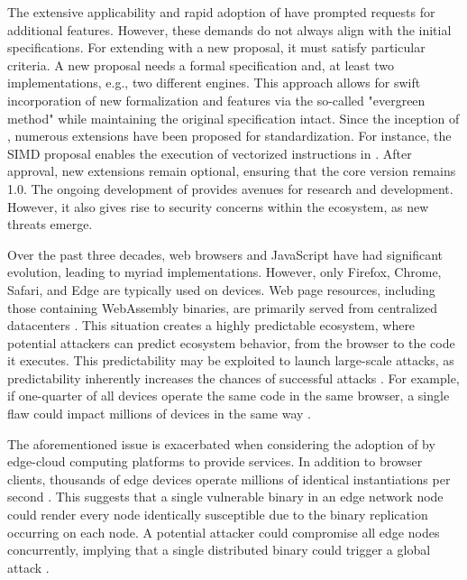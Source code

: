 The extensive applicability and rapid adoption of \Wasm have prompted requests for additional features. 
However, these demands do not always align with the initial specifications. 
For extending \Wasm with a new proposal, it must satisfy particular criteria.
A new proposal needs a formal specification and, at least two implementations, e.g., two different \Wasm engines. 
This approach allows for swift incorporation of new formalization and features via the so-called "evergreen method" while maintaining the original \Wasm specification intact. 
Since the inception of \Wasm, numerous extensions have been proposed for standardization. 
For instance, the SIMD proposal enables the execution of vectorized instructions in \Wasm. 
After approval, new extensions remain optional, ensuring that the core \Wasm version remains 1.0. 
The ongoing development of \Wasm provides avenues for research and development. 
However, it also gives rise to security concerns within the ecosystem, as new threats emerge.


Over the past three decades, web browsers and JavaScript have had significant evolution, leading to myriad implementations. 
However, only Firefox, Chrome, Safari, and Edge are typically used on devices. 
Web page resources, including those containing WebAssembly binaries, are primarily served from centralized datacenters \cite{STRAC}. 
This situation creates a highly predictable ecosystem, where potential attackers can predict ecosystem behavior, from the browser to the code it executes. 
This predictability may be exploited to launch large-scale attacks, as predictability inherently increases the chances of successful attacks \cite{MTDNationalCyberLaep}. 
For example, if one-quarter of all devices operate the same code in the same browser, a single flaw could impact millions of devices in the same way \cite{goth2003addressing}. 

The aforementioned issue is exacerbated when considering the adoption of \Wasm by edge-cloud computing platforms to provide services. 
In addition to browser clients, thousands of edge devices operate millions of identical \Wasm instantiations per second \cite{10034550}. 
This suggests that a single vulnerable \Wasm binary in an edge network node could render every node identically susceptible due to the binary replication occurring on each node.
A potential attacker could compromise all edge nodes concurrently, implying that a single distributed \Wasm binary could trigger a global attack .
 




